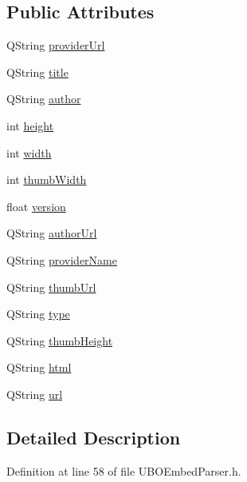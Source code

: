 \subsection*{Public Attributes}
\begin{DoxyCompactItemize}
\item 
Q\-String \hyperlink{structs_o_embed_content_adcee2b69becec892ab8a15ed5b793670}{provider\-Url}
\item 
Q\-String \hyperlink{structs_o_embed_content_a99a43aa9bb7239b4fc67200c58b50c28}{title}
\item 
Q\-String \hyperlink{structs_o_embed_content_a8253f0b5e913ae5d6e4609461e2bdf5a}{author}
\item 
int \hyperlink{structs_o_embed_content_ae8a962d881e0dc5d2d98b1015bece43e}{height}
\item 
int \hyperlink{structs_o_embed_content_a053703ffaa9305e87a159ffea87aaf4a}{width}
\item 
int \hyperlink{structs_o_embed_content_a0337e97679d083c49a665101f135b96a}{thumb\-Width}
\item 
float \hyperlink{structs_o_embed_content_a5df8726e71132a8b084c88b4ee902512}{version}
\item 
Q\-String \hyperlink{structs_o_embed_content_a65f2b8e89aff77f4e8f0720b62a911cd}{author\-Url}
\item 
Q\-String \hyperlink{structs_o_embed_content_a2760ef481807be5e5c46451b1d66dddf}{provider\-Name}
\item 
Q\-String \hyperlink{structs_o_embed_content_aa8d8b0e958739ccd29f5ad271d87c111}{thumb\-Url}
\item 
Q\-String \hyperlink{structs_o_embed_content_ae7c0ff53591ca3049ca84a7ee55cd1d7}{type}
\item 
Q\-String \hyperlink{structs_o_embed_content_a41fb9f61f6be269ed883baa1c2bc1180}{thumb\-Height}
\item 
Q\-String \hyperlink{structs_o_embed_content_a454a3bb4bd547e3340e25fedc4b46317}{html}
\item 
Q\-String \hyperlink{structs_o_embed_content_a5e8bca648a2390740dbae9cc8d8f0603}{url}
\end{DoxyCompactItemize}


\subsection{Detailed Description}


Definition at line 58 of file U\-B\-O\-Embed\-Parser.\-h.



